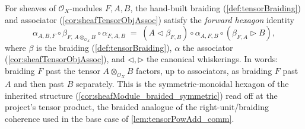 \begin{lemma}

  \label{lem:tensorBraiding_hexagon_forward}
  For sheaves of \(\mathcal{O}_X\)-modules \(F, A, B\), the hand-built braiding
  (\cref{def:tensorBraiding}) and associator (\cref{cor:sheafTensorObjAssoc})
  satisfy the \emph{forward hexagon} identity
  \[
    \alpha_{A,B,F} \circ
    \beta_{F,\,A\otimes_{\mathcal{O}_X}B} \circ
    \alpha_{F,A,B}
    \;=\;
    (A \lhd \beta_{F,B}) \circ
    \alpha_{A,F,B} \circ
    (\beta_{F,A} \rhd B),
  \]
  where \(\beta\) is the braiding (\cref{def:tensorBraiding}), \(\alpha\) the
  associator (\cref{cor:sheafTensorObjAssoc}), and \(\lhd,\rhd\) the canonical
  whiskerings. In words: braiding \(F\) past the tensor \(A\otimes_{\mathcal{O}_X}
  B\) factors, up to associators, as braiding \(F\) past \(A\) and then past
  \(B\) separately. This is the symmetric-monoidal hexagon of the inherited
  structure (\cref{cor:sheafModule_braided_symmetric}) read off at the project's
  tensor product, the braided analogue of the right-unit/braiding coherence used
  in the base case of \cref{lem:tensorPowAdd_comm}.
\end{lemma}

